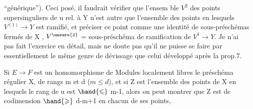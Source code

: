 
 ``générique'').   Ceci posé, il faudrait vérifier que l'ensem ble $V^2$
des points supersinguliers de u rel. à Y n'est autre que l'ensemble des
points en lesquels $V^{(1)} \longrightarrow Y$ est ramifié, et préciser ce point
comme une identité de sous-préschémas fermés de X , $V^{\unsure{2}}$ = sous-préschéma
de ramification de $V^1 \longrightarrow Y$. Je n'ai pas fait l'exercice en détail,
mais ne doute pas qu'il ne puisse se faire par essentiellement le même
 genre de dévissage que celui développé après la prop.7.

 Si $E \longrightarrow F$ est un homomorphisme de Modules localement libres  le préschéma régulier
X, de rangs m et d ($m \leqslant d$), et si Z est l'ensemble des points de X en
lesquels le rang de u est $\hand{\leqslant}$ m-1, alors on peut montrer que Z est de codimension $\hand{\geqslant}$ d-m+1
en chacun de ses points, 


